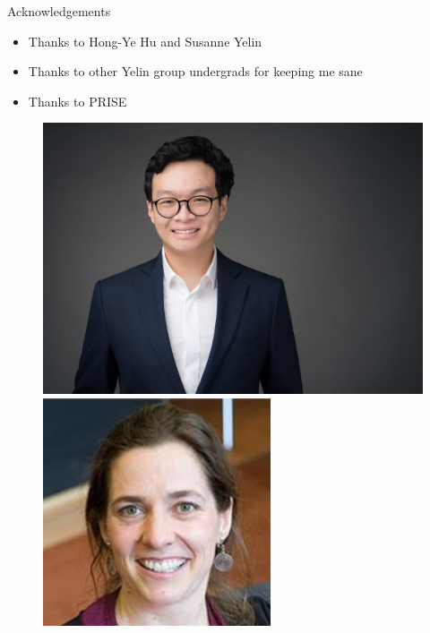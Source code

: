 \documentclass[xcolor=dvipsnames]{beamer}
\begin{document}
\begin{frame}{Acknowledgements}

  \begin{itemize}
    \item Thanks to Hong-Ye Hu and Susanne Yelin
    \item Thanks to other Yelin group undergrads for keeping me sane
    \item Thanks to PRISE
  \end{itemize}

  \begin{figure}
    \centering
    \begin{minipage}{0.3\textwidth}
        \centering
        \includegraphics[width=\textwidth]{hyh.png}
    \end{minipage}
    \begin{minipage}{0.3\textwidth}
        \centering
        \includegraphics[width=0.6\textwidth]{yelin.png}

\end{minipage}
\end{figure}
\end{frame}
\end{document}
